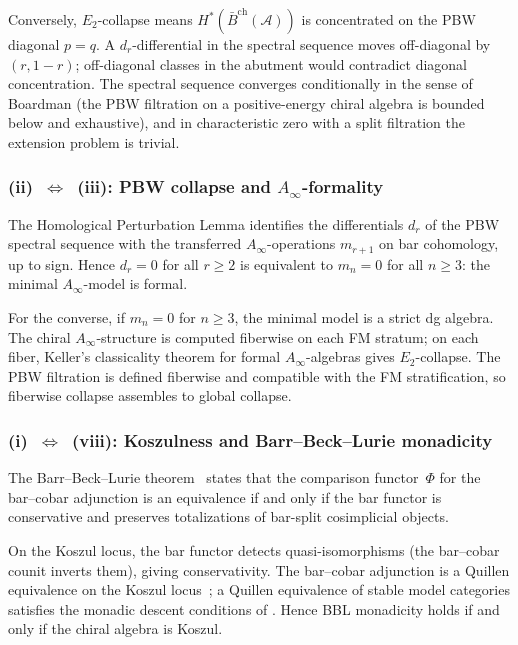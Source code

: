 \documentclass[11pt,reqno]{amsart}
\theoremstyle{definition}
\theoremstyle{remark}
\newcommand{\cA}{\mathcal{A}}
\newcommand{\barBch}{\bar{B}^{\mathrm{ch}}}
\newcommand{\Etwo}{E_2}
\newcommand{\Ainfty}{A_\infty}
\numberwithin{equation}{section}
\begin{document}
Conversely, $\Etwo$-collapse means $H^*(\barBch(\cA))$ is
concentrated on the PBW diagonal $p = q$. A $d_r$-differential
in the spectral sequence moves off-diagonal by $(r, 1-r)$;
off-diagonal classes in the abutment would contradict diagonal
concentration. The spectral sequence converges conditionally in
the sense of Boardman (the PBW filtration on a positive-energy
chiral algebra is bounded below and exhaustive), and in
characteristic zero with a split filtration the extension problem
is trivial.

\subsubsection*{\textup{(ii)}~$\Leftrightarrow$~\textup{(iii):}
PBW collapse and $\Ainfty$-formality}

The Homological Perturbation Lemma identifies the differentials
$d_r$ of the PBW spectral sequence with the transferred
$\Ainfty$-operations $m_{r+1}$ on bar cohomology, up to sign.
Hence $d_r = 0$ for all $r \geq 2$ is equivalent to $m_n = 0$
for all $n \geq 3$: the minimal $\Ainfty$-model is formal.

For the converse, if $m_n = 0$ for $n \geq 3$, the minimal model
is a strict dg algebra. The chiral $\Ainfty$-structure is computed
fiberwise on each FM stratum; on each fiber, Keller's classicality
theorem for formal $\Ainfty$-algebras gives $\Etwo$-collapse.
The PBW filtration is defined fiberwise and compatible with the FM
stratification, so fiberwise collapse assembles to global collapse.

\subsubsection*{\textup{(i)}~$\Leftrightarrow$~\textup{(viii):}
Koszulness and Barr--Beck--Lurie monadicity}

The Barr--Beck--Lurie theorem~\cite[Thm.~4.7.3.5]{HA} states that
the comparison functor~$\Phi$ for the bar--cobar adjunction is an
equivalence if and only if the bar functor is conservative and
preserves totalizations of bar-split cosimplicial objects.

On the Koszul locus, the bar functor detects quasi-isomorphisms
(the bar--cobar counit inverts them), giving conservativity. The
bar--cobar adjunction is a Quillen equivalence on the Koszul
locus~\cite[\S5]{LorgatMKD1}; a Quillen equivalence of stable
model categories satisfies the monadic descent conditions of
\cite[Prop.~4.7.3.16]{HA}. Hence BBL monadicity holds if and
only if the chiral algebra is Koszul.
\end{document}
